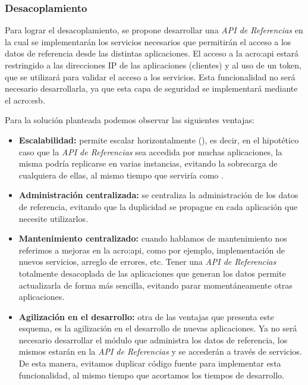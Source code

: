 \subsubsection{Desacoplamiento}

Para lograr el desacoplamiento, se propone desarrollar una \textit{API de Referencias} en la cual se implementarán los servicios necesarios que permitirán el acceso a los datos de referencia desde las distintas aplicaciones. El acceso a la \gls{acro:api} estará restringido a las direcciones IP de las aplicaciones (clientes) y al uso de un token, que se utilizará para validar el acceso a los servicios. Esta funcionalidad no será necesario desarrollarla, ya que esta capa de seguridad se implementará mediante el \gls{acro:esb}.

Para la solución planteada podemos observar las siguientes ventajas:

\begin{itemize}
  \item \textbf{Escalabilidad:} permite escalar horizontalmente (), es decir, en el hipotético caso que la \textit{API de Referencias} sea accedida por muchas aplicaciones, la misma podría replicarse en varias instancias, evitando la sobrecarga de cualquiera de ellas, al mismo tiempo que serviría como .

  \item \textbf{Administración centralizada:} se centraliza la administración de los datos de referencia, evitando que la duplicidad se propague en cada aplicación que necesite utilizarlos.

  \item \textbf{Mantenimiento centralizado:} cuando hablamos de mantenimiento nos referimos a mejoras en la \gls{acro:api}, como por ejemplo, implementación de nuevos servicios, arreglo de errores, etc. Tener una \textit{API de Referencias} totalmente desacoplada de las aplicaciones que generan los datos permite actualizarla de forma más sencilla, evitando parar momentáneamente otras aplicaciones.

  \item \textbf{Agilización en el desarrollo:} otra de las ventajas que presenta este esquema, es la agilización en el desarrollo de nuevas aplicaciones. Ya no será necesario desarrollar el módulo que administra los datos de referencia, los mismos estarán en la \textit{API de Referencias} y se accederán a través de servicios.  De esta manera, evitamos duplicar código fuente para implementar esta funcionalidad, al mismo tiempo que acortamos los tiempos de desarrollo.
\end{itemize}

